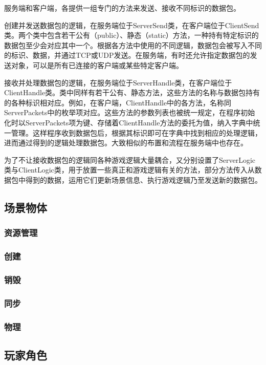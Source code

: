 \documentclass[conference]{IEEEtran}
\begin{document}
服务端和客户端，各提供一组专门的方法来发送、接收不同标识的数据包。

创建并发送数据包的逻辑，在服务端位于ServerSend类，在客户端位于ClientSend类。两个类中包含若干公有（public）、静态（static）方法，一种持有特定标识的数据包至少会对应其中一个。根据各方法中使用的不同逻辑，数据包会被写入不同的标识、数据，并通过TCP或UDP发送。在服务端，有时还允许指定数据包的发送对象，可以是所有已连接的客户端或某些特定客户端。

接收并处理数据包的逻辑，在服务端位于ServerHandle类，在客户端位于ClientHandle类。类中同样有若干公有、静态方法，这些方法的名称与数据包持有的各种标识相对应。例如，在客户端，ClientHandle中的各方法，名称同ServerPackets中的枚举项对应。这些方法的参数列表也被统一规定，在程序初始化时以ServerPackets项为键、存储着ClientHandle方法的委托为值，纳入字典中统一管理。这样程序收到数据包后，根据其标识即可在字典中找到相应的处理逻辑，进而通过得到的逻辑处理数据包。大致相似的布置和流程在服务端中也存在。

为了不让接收数据包的逻辑同各种游戏逻辑大量耦合，又分别设置了ServerLogic类与ClientLogic类，用于放置一些真正和游戏逻辑有关的方法，部分方法传入从数据包中得到的数据，运用它们更新场景信息、执行游戏逻辑乃至发送新的数据包。



\subsection{场景物体}
\subsubsection{资源管理}
\subsubsection{创建}
\subsubsection{销毁}
\subsubsection{同步}
\subsubsection{物理}


\subsection{玩家角色}
\end{document}
